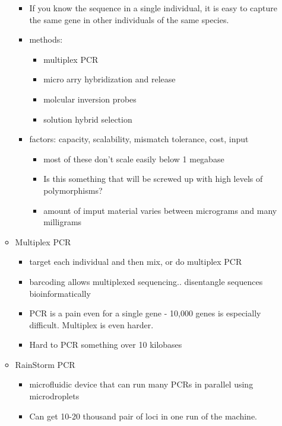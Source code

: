 \documentclass{article}
\begin{document}
\begin{itemize}
\begin{itemize}
\begin{itemize}
                \item If you know the sequence in a single individual, it is easy to capture the same gene in other individuals of the same species.
                \item methods:
                \begin{itemize}
                    \item multiplex PCR
                    \item micro arry hybridization and release
                    \item molcular inversion probes
                    \item solution hybrid selection
                \end{itemize}
                \item factors: capacity, scalability, mismatch tolerance, cost, input
                \begin{itemize}
                    \item most of these don't scale easily below 1 megabase
                    \item Is this something that will be screwed up with high levels of polymorphisms?
                    \item amount of imput material varies between micrograms and many milligrams
                \end{itemize}
            \end{itemize}
            \item Multiplex PCR
            \begin{itemize}
                \item target each individual and then mix, or do multiplex PCR
                \item barcoding allows multiplexed sequencing.. disentangle sequences bioinformatically
                \item PCR is a pain even for a single gene - 10,000 genes is especially difficult.  Multiplex is even harder.
                \item Hard to PCR something over 10 kilobases
            \end{itemize}
            \item RainStorm PCR
            \begin{itemize}
                \item microfluidic device that can run many PCRs in parallel using microdroplets
                \item Can get 10-20 thousand pair of loci in one run of the machine.

\end{itemize}
\end{itemize}
\end{itemize}
\end{document}
